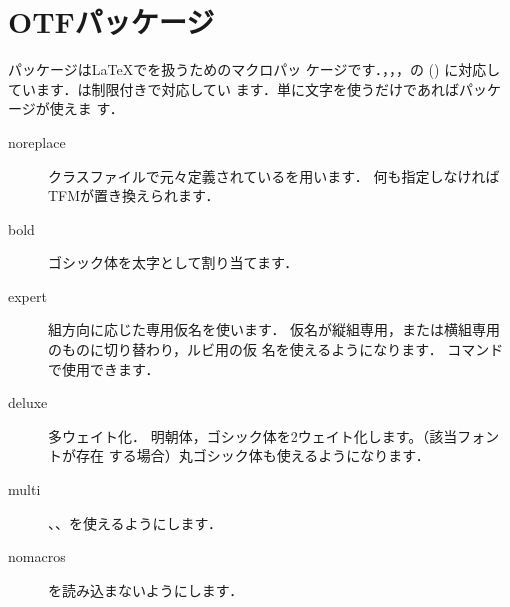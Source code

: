 
\section{OTFパッケージ}
\begin{usage}
\usepackage[$\<オプション>$]{otf} 
\end{usage}
パッケージは\LaTeX でを扱うためのマクロパッ
ケージです．，，，の () に対応しています．は制限付きで対応してい
ます．単に文字を使うだけであればパッケージが使えま
す．
\begin{description}
 \item[noreplace] 
	    クラスファイルで元々定義されているを用います．
	    何も指定しなければTFMが置き換えられます．
 \item[bold]      
	    ゴシック体を太字として割り当てます．
 \item[expert]    
	    組方向に応じた専用仮名を使います．
	    仮名が縦組専用，または横組専用のものに切り替わり，ルビ用の仮
	    名を使えるようになります．
	     コマンドで使用できます．
 \item[deluxe]    多ウェイト化．
	    明朝体，ゴシック体を2ウェイト化します。（該当フォントが存在
	    する場合）丸ゴシック体も使えるようになります．
 \item[multi]     
	    、、を使えるようにします．
 \item[nomacros]  
	    を読み込まないようにします．
\end{description}


